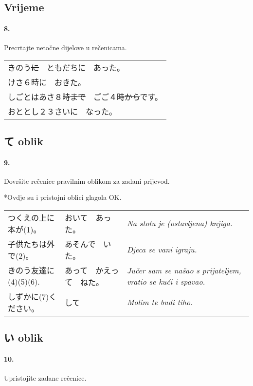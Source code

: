 \documentclass[12pt]{article}
\begin{document}
	\subsection{Vrijeme}
	
	\paragraph{8.} Precrtajte netočne dijelove u rečenicama.
	
	\begin{tabularx}{\textwidth}{X}
		きのう\sout{に}　ともだちに　あった。\\
		けさ６時に　おきた。\\
		しごとはあさ８時\sout{まで}　ごご４時\sout{から}です。\\
		おととし２３さいに　なった。\\
	\end{tabularx}

	\subsection{て oblik}
	
	\paragraph{9.} Dovršite rečenice pravilnim oblikom za zadani prijevod.
	
	*Ovdje su i pristojni oblici glagola OK.
	
	\begin{tabularx}{\textwidth}{X X X}
		つくえの上に本が(1)。&おいて　あった。& \textit{Na stolu je (ostavljena) knjiga.}\\
		子供たちは外で(2)。&あそんで　いた。& \textit{Djeca se vani igraju.}\\
		きのう友達に(4)(5)(6).&あって　かえって　ねた。&\textit{Jučer sam se našao s prijateljem, vratio se kući i spavao.}\\
		しずかに(7)ください。&して&\textit{Molim te budi tiho.}\\
	\end{tabularx}

	\subsection{い oblik}
	
	\paragraph{10.} Upristojite zadane rečenice.
	
\end{document}
